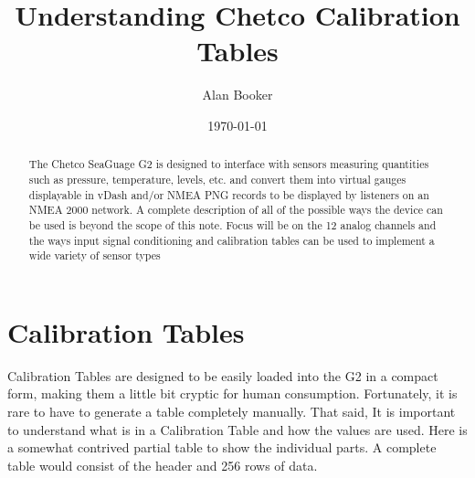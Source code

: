 \documentclass[12pt, letterpaper, twoside, titlepage]{article}
\title{Understanding Chetco Calibration Tables}
\author{Alan Booker
	 
	}
\date{\today}
\begin{document}
\maketitle


\begin{abstract}
The Chetco SeaGuage G2 is designed to interface with sensors measuring quantities such as pressure, temperature, levels, etc. and convert them into virtual gauges displayable in vDash and/or NMEA PNG records to be displayed by listeners on an NMEA 2000 network. A complete description of all of the possible ways the device can be used is beyond the scope of this note. Focus will be on the 12 analog channels and the ways input signal conditioning and calibration tables can be used to implement a wide variety of sensor types
\end{abstract}




\section{Calibration Tables}
Calibration Tables are designed to be easily loaded into the G2 in a compact form, making them a little bit cryptic for human consumption. Fortunately, it is rare to have to generate a table completely manually. That said, It is important to understand what is in a Calibration Table and how the values are used.  Here is a somewhat contrived partial table to show the individual parts.  A complete table would consist of the header and 256 rows of data.
\end{document}
